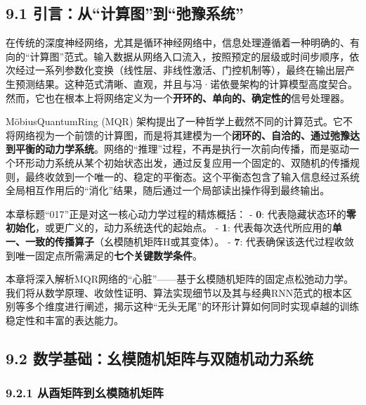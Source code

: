 \documentclass[
  12pt,
]{article}
\begin{document}
\hypertarget{ux5f15ux8a00ux4eceux8ba1ux7b97ux56feux5230ux5f1bux8c6bux7cfbux7edf}{%
\subsection{9.1
引言：从``计算图''到``弛豫系统''}\label{ux5f15ux8a00ux4eceux8ba1ux7b97ux56feux5230ux5f1bux8c6bux7cfbux7edf}}

在传统的深度神经网络，尤其是循环神经网络中，信息处理遵循着一种明确的、有向的``计算图''范式。输入数据从网络入口流入，按照预定的层级或时间步顺序，依次经过一系列参数化变换（线性层、非线性激活、门控机制等），最终在输出层产生预测结果。这种范式清晰、直观，并且与冯·诺依曼架构的计算模型高度契合。然而，它也在根本上将网络定义为一个\textbf{开环的、单向的、确定性的}信号处理器。

MöbiusQuantumRing (MQR)
架构提出了一种哲学上截然不同的计算范式。它不将网络视为一个前馈的计算图，而是将其建模为一个\textbf{闭环的、自洽的、通过弛豫达到平衡的动力学系统}。网络的``推理''过程，不再是执行一次前向传播，而是驱动一个环形动力系统从某个初始状态出发，通过反复应用一个固定的、双随机的传播规则，最终收敛到一个唯一的、稳定的平衡态。这个平衡态包含了输入信息经过系统全局相互作用后的``消化''结果，随后通过一个局部读出操作得到最终输出。

本章标题``017''正是对这一核心动力学过程的精炼概括： - \textbf{0}:
代表隐藏状态环的\textbf{零初始化}，或更广义的，动力系统迭代的起始点。 -
\textbf{1}:
代表每次迭代所应用的\textbf{单一、一致的传播算子}（幺模随机矩阵H或其变体）。
- \textbf{7}:
代表确保该迭代过程收敛到唯一固定点所需满足的\textbf{七个关键数学条件}。

本章将深入解析MQR网络的``心脏''------基于幺模随机矩阵的固定点松弛动力学。我们将从数学原理、收敛性证明、算法实现细节以及其与经典RNN范式的根本区别等多个维度进行阐述，揭示这种``无头无尾''的环形计算如何同时实现卓越的训练稳定性和丰富的表达能力。

\hypertarget{ux6570ux5b66ux57faux7840ux5e7aux6a21ux968fux673aux77e9ux9635ux4e0eux53ccux968fux673aux52a8ux529bux7cfbux7edf}{%
\subsection{9.2
数学基础：幺模随机矩阵与双随机动力系统}\label{ux6570ux5b66ux57faux7840ux5e7aux6a21ux968fux673aux77e9ux9635ux4e0eux53ccux968fux673aux52a8ux529bux7cfbux7edf}}

\hypertarget{ux4eceux9149ux77e9ux9635ux5230ux5e7aux6a21ux968fux673aux77e9ux9635-2}{%
\subsubsection{9.2.1
从酉矩阵到幺模随机矩阵}\label{ux4eceux9149ux77e9ux9635ux5230ux5e7aux6a21ux968fux673aux77e9ux9635-2}}
\end{document}
